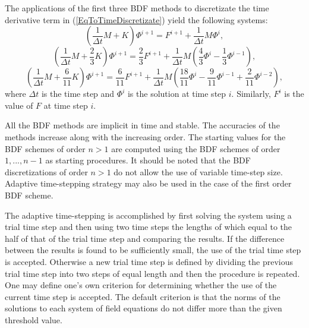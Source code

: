 The applications of the first three BDF methods to discretizate the time derivative term
in (\ref{EqToTimeDiscretizate}) yield the following systems:
\begin{equation}\label{BDF1}
\left (\frac{1}{\Delta t}M+K\right )\Phi^{i+1} = F^{i+1} + \frac{1}{\Delta t}M\Phi^{i},
\end{equation}
\begin{equation}
\left (\frac{1}{\Delta t}M+\frac{2}{3}K\right )\Phi^{i+1} = \frac{2}{3}F^{i+1} + \frac{1}{\Delta t}M
\left( \frac{4}{3}\Phi^{i}-\frac{1}{3}\Phi^{i-1}\right ),
\end{equation}
\begin{equation}
\left (\frac{1}{\Delta t}M+\frac{6}{11}K\right )\Phi^{i+1} = \frac{6}{11}F^{i+1} + \frac{1}{\Delta t}M
\left( \frac{18}{11}\Phi^{i}-\frac{9}{11}\Phi^{i-1}+\frac{2}{11}\Phi^{i-2}\right ),
\end{equation}
where $\Delta t$ is the time step and $\Phi^{i}$ is the solution at time step $i$.
Similarly, $F^{i}$ is the value of $F$ at time step $i$.

All the BDF methods are implicit in time and stable. The accuracies of the
methods increase along with the increasing order. The starting values for the
BDF schemes of order $n>1$ are computed using the BDF schemes of order $1,...,n-1$
as starting procedures. It should be noted that the BDF discretizations of order $n>1$ 
do not allow the use of variable time-step size. 
Adaptive time-stepping strategy may also be used in the case of the first order BDF scheme.

The adaptive time-stepping is accomplished by first solving the system
using a trial time step and then using two time steps the lengths of which equal to the 
half of that of the trial time step and comparing the results. 
If the difference between the results is found to be sufficiently small, the use of
the trial time step is accepted. Otherwise a new trial time step is defined by dividing
the previous trial time step into two steps of equal length and then the procedure 
is repeated. One may define one's own criterion for determining whether the use of 
the current time step is accepted.
The default criterion is that the norms of the solutions to each system of field equations 
do not differ more than the given threshold value.

